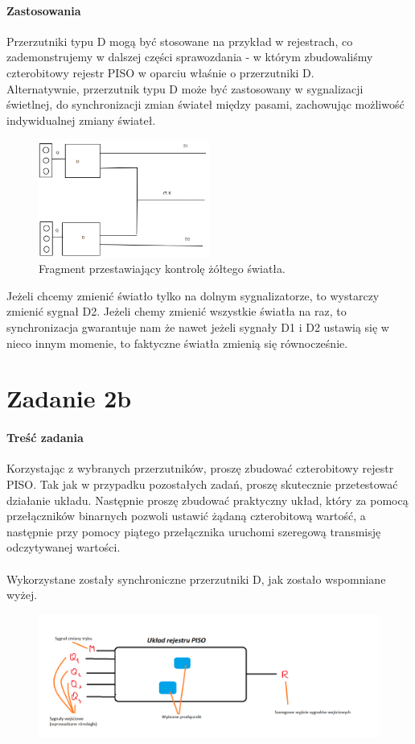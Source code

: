 \documentclass{article}
\begin{document}
\paragraph{Zastosowania}
Przerzutniki typu D mogą być stosowane na przykład w rejestrach, co zademonstrujemy w dalszej części sprawozdania - w którym zbudowaliśmy czterobitowy rejestr PISO w oparciu właśnie o przerzutniki D. \\
Alternatywnie, przerzutnik typu D może być zastosowany w sygnalizacji świetlnej, do synchronizacji zmian świateł między pasami, zachowując możliwość indywidualnej zmiany świateł.
\begin{figure}[H]
\includegraphics[width = 0.5\textwidth]{sygnalizacja}
\caption{Fragment przestawiający kontrolę żółtego światła.}
\end{figure}
Jeżeli chcemy zmienić światło tylko na dolnym sygnalizatorze, to wystarczy zmienić sygnał D2. Jeżeli chemy zmienić wszystkie światła na raz, to synchronizacja gwarantuje nam że nawet jeżeli sygnały D1 i D2 ustawią się w nieco innym momenie, to faktyczne światła zmienią się równocześnie.

\section{Zadanie 2b}
\paragraph{Treść zadania}
Korzystając z wybranych przerzutników, proszę zbudować czterobitowy rejestr PISO. Tak jak w przypadku pozostałych zadań, proszę skutecznie przetestować działanie układu. Następnie proszę zbudować praktyczny układ, który za pomocą przełączników binarnych pozwoli ustawić żądaną czterobitową wartość, a następnie przy pomocy piątego przełącznika uruchomi szeregową transmisję odczytywanej wartości.
\paragraph{} Wykorzystane zostały synchroniczne przerzutniki D, jak zostało wspomniane wyżej.
\begin{figure}[H]
\includegraphics[width = \textwidth]{BlackBox}
\end{figure}
\end{document}
